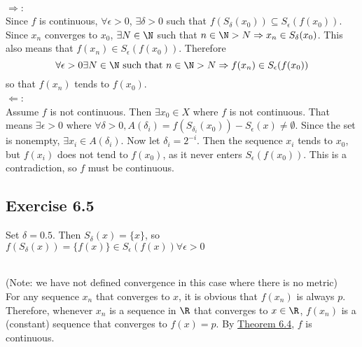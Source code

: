 \begin{solution}
 \\$\Rightarrow$: \\
Since $f$ is continuous, $\forall \epsilon > 0$, $\exists \delta > 0$ such that $f(S_\delta(x_0)) \subseteq S_\epsilon(f(x_0))$. Since $x_n$ converges to $x_0$, $\exists N \in \N$ such that $n \in \N > N \Rightarrow x_n \in S_\delta(x_0)$. This also means that $f(x_n) \in S_\epsilon(f(x_0))$. Therefore
$$\forall \epsilon > 0 \exists N \in \N\text{ such that } n \in \N > N \Rightarrow f(x_n) \in S_\epsilon(f(x_0))$$
so that $f(x_n)$ tends to $f(x_0)$. \\
$\Leftarrow$: \\
Assume $f$ is not continuous. Then $\exists x_0 \in X$ where $f$ is not continuous. That means $\exists \epsilon > 0$ where $\forall \delta > 0, A(\delta_i) = f(S_{\delta_i}(x_0)) - S_\epsilon(x) \neq \emptyset$. Since the set is nonempty, $\exists x_i \in A(\delta_i)$. Now let $\delta_i = 2^{-i}$. Then the sequence $x_i$ tends to $x_0$, but $f(x_i)$ does not tend to $f(x_0)$, as it never enters $S_\epsilon(f(x_0))$. This is a contradiction, so $f$ must be continuous.
\end{solution}

\subsection{Exercise 6.5}
\setcounter{question}{0}


\begin{solution}
 Set $\delta = 0.5$. Then $S_\delta(x) = \{x\}$, so $f(S_\delta(x)) = \{f(x)\} \in S_\epsilon(f(x)) \forall \epsilon > 0$
\end{solution}


\begin{solution}
 \\(Note: we have not defined convergence in this case where there is no metric) \\
 For any sequence $x_n$ that converges to $x$, it is obvious that $f(x_n)$ is always $p$. Therefore, whenever $x_n$ is a sequence in $\R$ that converges to $x \in \R$, $f(x_n)$ is a (constant) sequence that converges to $f(x) = p$. By \hyperref[thm3.6.4]{Theorem 6.4}, $f$ is continuous.
\end{solution}

